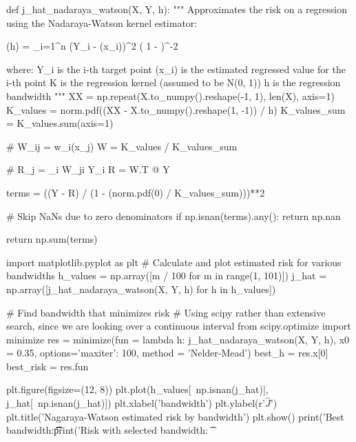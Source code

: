 \begin{python}
def j_hat_nadaraya_watson(X, Y, h):
    """
    Approximates the risk on a regression using the Nadaraya-Watson kernel estimator:
    
      (h) = \sum_{i=1}^{n} (Y_{i} - (x_{i}))^{2} 
      ( 1 -  )^{-2}
      
    where:
      Y_{i} is the i-th target point
      (x_{i}) is the estimated regressed value for the i-th point
      K is the regression kernel (assumed to be N(0, 1))
      h is the regression bandwidth
    """
    XX = np.repeat(X.to_numpy().reshape(-1, 1), len(X), axis=1)
    K_values = norm.pdf((XX - X.to_numpy().reshape(1, -1)) / h)
    K_values_sum = K_values.sum(axis=1)
    
    # W_{i}j = w_{i}(x_{j})
    W = K_values / K_values_sum
    
    # R_{j} = \sum_{i} W_{j}i Y_{i} 
    R = W.T @ Y
    
    terms = ((Y - R) / (1 - (norm.pdf(0) / K_values_sum)))**2
    
    # Skip NaNs due to zero denominators
    if np.isnan(terms).any():
        return np.nan
    
    return np.sum(terms)
\end{python}

\begin{python}
import matplotlib.pyplot as plt
# Calculate and plot estimated risk for various bandwidths
h_values = np.array([m / 100 for m in range(1, 101)])
j_hat = np.array([j_hat_nadaraya_watson(X, Y, h) for h in h_values])
\end{python}

\begin{python}
# Find bandwidth that minimizes risk
# Using scipy rather than extensive search, since we are looking over a continuous interval
from scipy.optimize import minimize
res = minimize(fun = lambda h: j_hat_nadaraya_watson(X, Y, h), x0 = 0.35, 
               options={'maxiter': 100}, method = 'Nelder-Mead')
best_h = res.x[0]
best_risk = res.fun
\end{python}

\begin{python}
plt.figure(figsize=(12, 8))
plt.plot(h_values[~np.isnan(j_hat)], j_hat[~np.isnan(j_hat)])
plt.xlabel('bandwidth')
plt.ylabel(r'$\hat{J}$')
plt.title('Nagaraya-Watson estimated risk by bandwidth')
plt.show()
print('Best bandwidth:\t\t\t%
print('Risk with selected bandwidth: \t%
\end{python}

